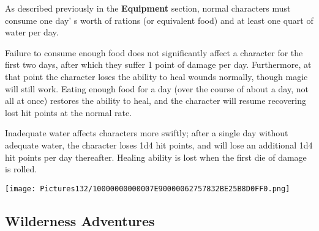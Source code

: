 \documentclass[a4paper,twoside,openany,10pt]{book}
\begin{document}
\begin{multicols}{2}
As described previously in the \textbf{Equipment} section, normal characters must consume one day' s worth of rations (or equivalent food) and at least one quart of water per day.

Failure to consume enough food does not significantly affect a character for the first two days, after which they suffer 1 point of damage per day. Furthermore, at that point the character loses the ability to heal wounds normally, though magic will still work. Eating enough food for a day (over the course of about a day, not all at once) restores the ability to heal, and the character will resume recovering lost hit points at the normal rate.

Inadequate water affects characters more swiftly; after a single day without adequate water, the character loses 1d4 hit points, and will lose an additional 1d4 hit points per day thereafter. Healing ability is lost when the first die of damage is rolled.

\end{multicols}

\vfill

\begin{center}
	\texttt{[image: Pictures132/10000000000007E90000062757832BE25B8D0FF0.png]}
\end{center}

\pagebreak

\subsection{Wilderness Adventures}\label{wilderness-adventures}
\end{document}
